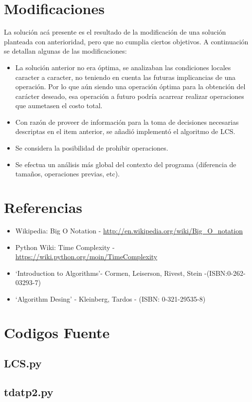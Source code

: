 \documentclass[12pt]{article}
\begin{document}
\newpage
\section{Modificaciones}
	La solución acá presente es el resultado de la modificación de una
	solución planteada con anterioridad, pero que no cumplia ciertos
	objetivos. A continuación se detallan algunas de las modificaciones:
	\begin{itemize}
		\item La solución anterior no era óptima, se analizaban las condiciones
		locales caracter a caracter, no teniendo en cuenta las futuras 
		implicancias de una operación. Por lo que aún siendo una operación
		óptima para la obtención del carácter deseado, esa operación a 
		futuro podría acarrear realizar operaciones que aumetasen el costo
		total.
		\item Con razón de proveer de información para la toma de decisiones
		necesarias descriptas en el item anterior, se añadió implementó
		el algoritmo de LCS.
		\item Se considera la posibilidad de prohibir operaciones.
		\item Se efectua un análisis más global del contexto del programa
		(diferencia de tamaños, operaciones previas, etc).
	\end{itemize}

\newpage
\section{Referencias}
	\begin{itemize}
		\item Wikipedia: Big O Notation - \url{http://en.wikipedia.org/wiki/Big_O_notation}
		\item Python Wiki: Time Complexity - \url{https://wiki.python.org/moin/TimeComplexity}
		\item `Introduction to Algorithms'- Cormen, Leiserson, Rivest, Stein -(ISBN:0-262-03293-7)
		\item `Algorithm Desing' - Kleinberg, Tardos - (ISBN: 0-321-29535-8)
	\end{itemize}
\newpage
\section{Codigos Fuente}\label{sec:sourcecode}
\subsection{LCS.py}\label{subsec:lcs}


\newpage
\subsection{tdatp2.py}\label{subsec:tdatp2}

\end{document}
